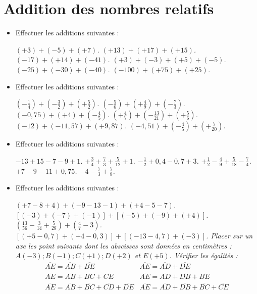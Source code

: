 \chapter{Addition des nombres relatifs}

\begin{itemize}
\item Effectuer les additions suivantes : 
\begin{itemize}
\it $(+3)+(-5)+(+7)$.
\it $(+13)+(+17)+(+15)$. 
\it $(-17)+(+14)+(-41)$. 
\it $(+3)+(-3)+(+5)+(-5)$. 
\it $(-25)+(-30)+(-40)$.
\it $(-100)+(+75)+(+25)$. 
\end{itemize}
\item Effectuer les additions suivantes : 
\begin{itemize}
\it $\left(-\frac14\right)+\left(-\frac32\right)+\left(+\frac52\right)$.
\it $\left(-\frac56\right)+\left(+\frac49\right)+\left(-\frac73\right)$.
\it $(-0,75) + (+4) + \left(-\frac45\right)$.
\it $\left(+\frac47\right)+\left(-\frac{13}{21}\right)+\left(+\frac56\right)$.
\it $(-12)+(-11,57)+(+9,87)$. 
\it $ (-4,51)+\left(-\frac45\right)+\left(+\frac7{20}\right)$.
\end{itemize}
\item Effectuer les additions suivantes : 
\begin{itemize}
\it $-13+15-7-9+1$.
\it $+\frac34+\frac73+\frac5{12}+1$.
\it $-\frac12+0,4-0,7+3$.
\it $+\frac12-\frac49+\frac5{18}-\frac74$.
\it $+7-9-11+0,75$. 
\it $-4-\frac73+\frac78$.
\end{itemize}
\item Effectuer les additions suivantes : 
\begin{itemize}
\it $(+7-8+4)+(-9-13-1)+(+4-5-7)$.
\it $[(-3)+(-7)+(-1)] + [(-5)+(-9)+(+4)]$.
\it $\left(\frac{13}{56}-\frac3{14}+\frac5{28}\right)+\left(\frac47-3\right)$. 
\it $[(+5-0,7)+(+4-0,3)]+[(-13-4,7)+(-3)]$.
\it Placer sur un axe les point suivants dont les abscisses sont données en centimètres :\\ $A(-3); B(-1); C(+1); D(+2)$ et $E(+5)$. Vérifier les égalités :
\[\begin{array}{ll}
\overline{AE} = \overline{AB}+\overline{BE} & \overline{AE} = \overline{AD}+\overline{DE}\\
\overline{AE} = \overline{AB}+\overline{BC}+\overline{CE}&\overline{AE} = \overline{AD}+\overline{DB}+\overline{BE}\\
\overline{AE}=\overline{AB}+\overline{BC}+\overline{CD}+\overline{DE} & \overline{AE} = \overline{AD}+\overline{DB}+\overline{BC}+\overline{CE}
\end{array}\]
\end{itemize}
\end{itemize}